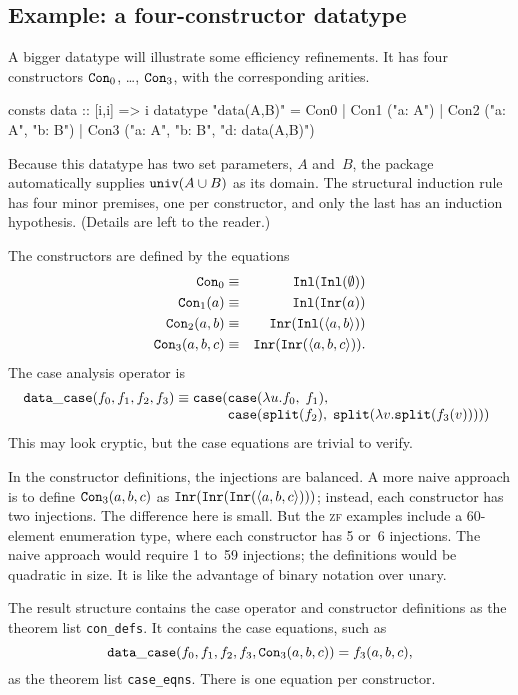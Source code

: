 \documentclass[12pt]{article}
\newcommand\split{\hbox{\tt split}}
\newcommand\univ{\hbox{\tt univ}}
\newcommand\Inl{\hbox{\tt Inl}}
\newcommand\Inr{\hbox{\tt Inr}}
\newcommand\case{\hbox{\tt case}}
\newcommand\Con{\hbox{\tt Con}}
\begin{document}
\subsection{Example: a four-constructor datatype}
A bigger datatype will illustrate some efficiency 
refinements.  It has four constructors $\Con_0$, \ldots, $\Con_3$, with the
corresponding arities.
\begin{ttbox}
consts    data :: [i,i] => i
datatype  "data(A,B)" = Con0
                      | Con1 ("a: A")
                      | Con2 ("a: A", "b: B")
                      | Con3 ("a: A", "b: B", "d: data(A,B)")
\end{ttbox}
Because this datatype has two set parameters, $A$ and~$B$, the package
automatically supplies $\univ(A\un B)$ as its domain.  The structural
induction rule has four minor premises, one per constructor, and only the last
has an induction hypothesis.  (Details are left to the reader.)

The constructors are defined by the equations
\begin{eqnarray*}
  \Con_0         & \equiv & \Inl(\Inl(\emptyset)) \\
  \Con_1(a)      & \equiv & \Inl(\Inr(a)) \\
  \Con_2(a,b)    & \equiv & \Inr(\Inl(\pair{a,b})) \\
  \Con_3(a,b,c)  & \equiv & \Inr(\Inr(\pair{a,b,c})).
\end{eqnarray*} 
The case analysis operator is
\[ {\tt data\_case}(f_0,f_1,f_2,f_3) \equiv 
    \case(\begin{array}[t]{@{}l}
          \case(\lambda u.f_0,\; f_1),\, \\
          \case(\split(f_2),\; \split(\lambda v.\split(f_3(v)))) )
   \end{array} 
\]
This may look cryptic, but the case equations are trivial to verify.

In the constructor definitions, the injections are balanced.  A more naive
approach is to define $\Con_3(a,b,c)$ as $\Inr(\Inr(\Inr(\pair{a,b,c})))$;
instead, each constructor has two injections.  The difference here is small.
But the \textsc{zf} examples include a 60-element enumeration type, where each
constructor has 5 or~6 injections.  The naive approach would require 1 to~59
injections; the definitions would be quadratic in size.  It is like the
advantage of binary notation over unary.

The result structure contains the case operator and constructor definitions as
the theorem list \verb|con_defs|. It contains the case equations, such as 
\[ {\tt data\_case}(f_0,f_1,f_2,f_3,\Con_3(a,b,c)) = f_3(a,b,c), \]
as the theorem list \verb|case_eqns|.  There is one equation per constructor.
\end{document}
